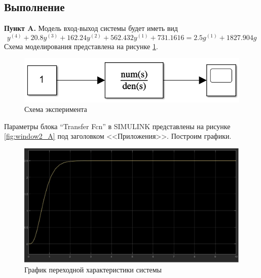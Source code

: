 \documentclass[a4paper, 12pt]{article}
\begin{document}
    \subsection{Выполнение}
    \textbf{Пункт A.} Модель вход-выход системы будет иметь вид
    $$y^{(4)}+20.8y^{(3)}+162.24y^{(2)}+562.432y^{(1)}+731.1616=2.5g^{(1)}+1827.904g$$
    Схема моделирования представлена на рисунке \ref{fig:scheme2}.
    \begin{figure}[H]
        \centering
        \includegraphics[scale=0.6]{scheme2.png}
        \captionsetup{skip=0pt}
        \caption{Схема эксперимента}
        \label{fig:scheme2}
    \end{figure}
    \noindent Параметры блока ``Transfer Fcn'' в SIMULINK
    представлены на рисунке \ref{fig:window2_A} под заголовком <<Приложения>>. Построим графики.
    \begin{figure}[H]
        \centering
        \includegraphics[scale=0.3]{task_2_A.jpg}
        \captionsetup{skip=0pt}
        \caption{График переходной характеристики системы}
        \label{fig:2A}
    \end{figure}
\end{document}
